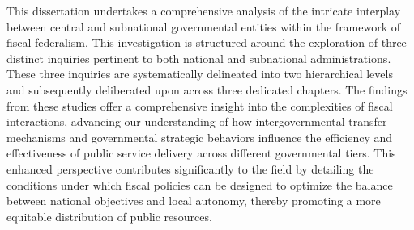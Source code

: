 
This dissertation undertakes a comprehensive analysis of the intricate interplay between central and subnational governmental entities within the framework of fiscal federalism. This investigation is structured around the exploration of three distinct inquiries pertinent to both national and subnational administrations. These three inquiries are systematically delineated into two hierarchical levels and subsequently deliberated upon across three dedicated chapters. The findings from these studies offer a comprehensive insight into the complexities of fiscal interactions, advancing our understanding of how intergovernmental transfer mechanisms and governmental strategic behaviors influence the efficiency and effectiveness of public service delivery across different governmental tiers. This enhanced perspective contributes significantly to the field by detailing the conditions under which fiscal policies can be designed to optimize the balance between national objectives and local autonomy, thereby promoting a more equitable distribution of public resources.



